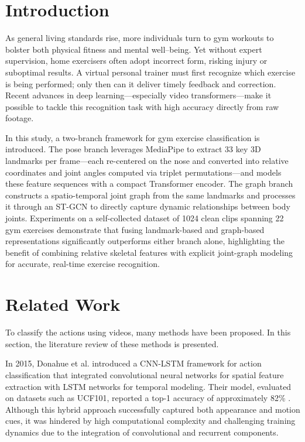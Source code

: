 \documentclass[runningheads]{llncs}
\begin{document}
\section{Introduction}

As general living standards rise, more individuals turn to gym workouts to bolster both physical fitness and mental well–being. 
Yet without expert supervision, home exercisers often adopt incorrect form, risking injury or suboptimal results. 
A virtual personal trainer must first recognize which exercise is being performed; only then can it deliver timely feedback and correction. 
Recent advances in deep learning—especially video transformers—make it possible to tackle this recognition task with high accuracy directly from raw footage.

In this study, a two-branch framework for gym exercise classification is introduced. 
The pose branch leverages MediaPipe to extract 33 key 3D landmarks per frame—each re-centered on the nose and converted into relative coordinates and joint angles computed via triplet permutations—and models these feature sequences with a compact Transformer encoder. 
The graph branch constructs a spatio-temporal joint graph from the same landmarks and processes it through an ST-GCN to directly capture dynamic relationships between body joints. 
Experiments on a self-collected dataset of 1024 clean clips spanning 22 gym exercises demonstrate that fusing landmark-based and graph-based representations significantly outperforms either branch alone, highlighting the benefit of combining relative skeletal features with explicit joint-graph modeling for accurate, real-time exercise recognition.

\section{Related Work}

To classify the actions using videos, many methods have been proposed. In this section, the literature review of these methods is presented.

In 2015, Donahue et al. introduced a CNN-LSTM framework for action classification that integrated convolutional neural networks for spatial feature extraction with LSTM networks for temporal modeling. 
Their model, evaluated on datasets such as UCF101, reported a top-1 accuracy of approximately 82\% \cite{donahue2015}. 
Although this hybrid approach successfully captured both appearance and motion cues, it was hindered by high computational complexity and challenging training dynamics due to the integration of convolutional and recurrent components.
\end{document}

